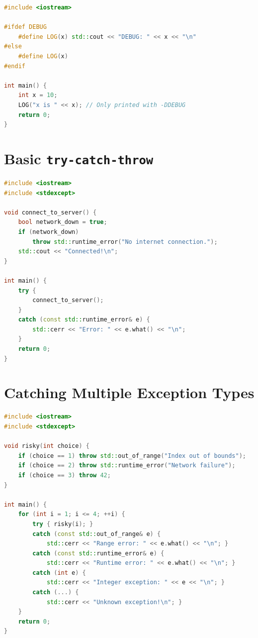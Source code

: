 \begin{lstlisting}[language=C++, caption={Conditional debug logging macro}]
#include <iostream>

#ifdef DEBUG
    #define LOG(x) std::cout << "DEBUG: " << x << "\n"
#else
    #define LOG(x)
#endif

int main() {
    int x = 10;
    LOG("x is " << x); // Only printed with -DDEBUG
    return 0;
}
\end{lstlisting}

\section{Basic \texttt{try-catch-throw}}
\label{sec:try-catch-throw}

\begin{lstlisting}[language=C++, caption={Basic exception flow}]
#include <iostream>
#include <stdexcept>

void connect_to_server() {
    bool network_down = true;
    if (network_down)
        throw std::runtime_error("No internet connection.");
    std::cout << "Connected!\n";
}

int main() {
    try {
        connect_to_server();
    }
    catch (const std::runtime_error& e) {
        std::cerr << "Error: " << e.what() << "\n";
    }
    return 0;
}
\end{lstlisting}

\section{Catching Multiple Exception Types}
\label{sec:multiple-catch}

\begin{lstlisting}[language=C++, caption={Multiple catch clauses — specific before general}]
#include <iostream>
#include <stdexcept>

void risky(int choice) {
    if (choice == 1) throw std::out_of_range("Index out of bounds");
    if (choice == 2) throw std::runtime_error("Network failure");
    if (choice == 3) throw 42;
}

int main() {
    for (int i = 1; i <= 4; ++i) {
        try { risky(i); }
        catch (const std::out_of_range& e) {
            std::cerr << "Range error: " << e.what() << "\n"; }
        catch (const std::runtime_error& e) {
            std::cerr << "Runtime error: " << e.what() << "\n"; }
        catch (int e) {
            std::cerr << "Integer exception: " << e << "\n"; }
        catch (...) {
            std::cerr << "Unknown exception!\n"; }
    }
    return 0;
}
\end{lstlisting}

